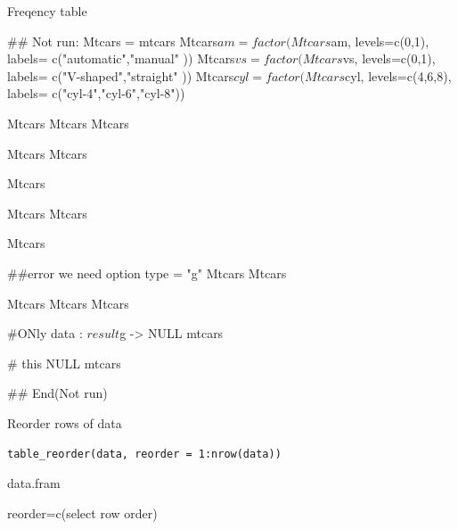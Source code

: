 \documentclass[a4paper]{book}
\begin{document}
%
\begin{Value}
Freqency table
\end{Value}
%
\begin{Examples}
\begin{ExampleCode}
\#\# Not run: 
Mtcars = mtcars
Mtcars$am = factor(Mtcars$am, levels=c(0,1), labels= c("automatic","manual" ))
Mtcars$vs  = factor(Mtcars$vs, levels=c(0,1), labels= c("V-shaped","straight" ))
Mtcars$cyl  = factor(Mtcars$cyl, levels=c(4,6,8), labels= c("cyl-4","cyl-6","cyl-8"))

Mtcars %
Mtcars %
Mtcars %

Mtcars %
Mtcars %

Mtcars %

Mtcars %
Mtcars %

Mtcars %

##error we need option  type = "g"
Mtcars %
Mtcars %

Mtcars %
Mtcars %
Mtcars %

#ONly data : $result  $g -> NULL
 mtcars %

# this NULL
mtcars %

## End(Not run)



\end{ExampleCode}
\end{Examples}
%
\begin{Description}
Reorder rows of data
\end{Description}
%
\begin{Usage}
\begin{verbatim}
table_reorder(data, reorder = 1:nrow(data))
\end{verbatim}
\end{Usage}
%
\begin{Arguments}
\begin{ldescription}
\item[\code{data}] data.fram

\item[\code{reorder}] reorder=c(select row order)
\end{ldescription}
\end{Arguments}
\end{document}
